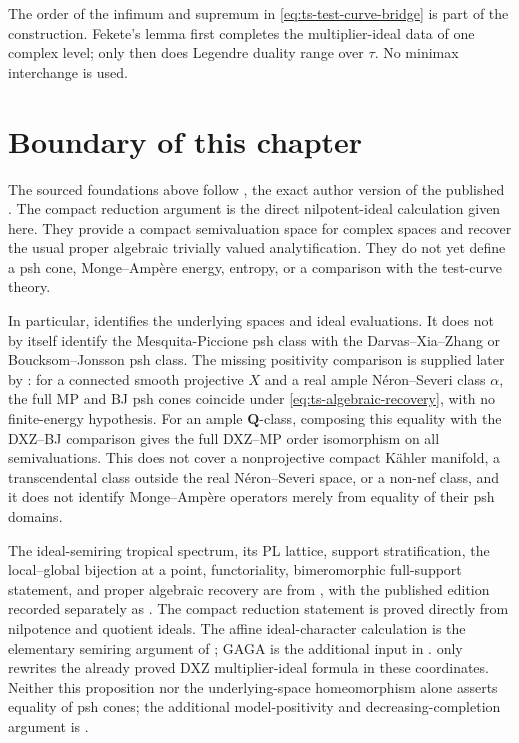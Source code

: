 The order of the infimum and supremum in
\eqref{eq:ts-test-curve-bridge} is part of the construction.  Fekete's
lemma first completes the multiplier-ideal data of one complex level; only
then does Legendre duality range over $\tau$.  No minimax interchange is
used.

\section{Boundary of this chapter}
\label{sec:ts-boundary}

The sourced foundations above follow \cite{MPTropicalV2}, the exact
author version of the published \cite{MP24}. The compact reduction
argument is the direct nilpotent-ideal calculation given here.
They provide a compact semivaluation space for complex spaces and recover the
usual proper algebraic trivially valued analytification.
They do not yet define a psh cone, Monge--Amp\`ere energy, entropy, or a
comparison with the test-curve theory.

In particular,  identifies the underlying
spaces and ideal evaluations.
It does not by itself identify the Mesquita-Piccione psh class with the
Darvas--Xia--Zhang or Boucksom--Jonsson psh class.
The missing positivity comparison is supplied later by
: for a connected smooth projective
$X$ and a real ample N\'eron--Severi class $\alpha$, the full MP and BJ
psh cones coincide under \eqref{eq:ts-algebraic-recovery}, with no
finite-energy hypothesis.  For an ample $\mathbf Q$-class, composing
this equality with the DXZ--BJ comparison gives the full DXZ--MP order
isomorphism on all semivaluations.  This does not cover a nonprojective
compact K\"ahler manifold, a transcendental class outside the real
N\'eron--Severi space, or a non-nef class, and it does not identify
Monge--Amp\`ere operators merely from equality of their psh domains.

\begin{remark}
\label{rem:ts-primary-source-boundary}
The ideal-semiring tropical spectrum, its PL lattice, support
stratification, the local--global bijection at a point, functoriality,
bimeromorphic full-support statement, and proper algebraic recovery are from
\cite[Sections~1.2--2.1]{MPTropicalV2}, with the published edition
recorded separately as \cite{MP24}. The compact reduction statement
 is proved directly from nilpotence and quotient
ideals. The affine ideal-character calculation is
the elementary semiring argument of
; GAGA is the additional input in
.   only
rewrites the already proved DXZ
multiplier-ideal formula in these coordinates.  Neither this proposition nor
the underlying-space homeomorphism alone asserts equality of psh cones; the
additional model-positivity and decreasing-completion argument is
.
\end{remark}
